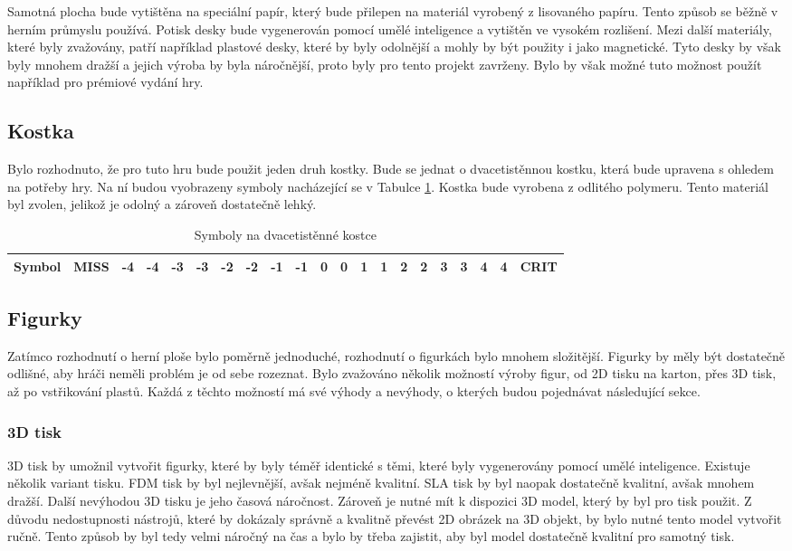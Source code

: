 Samotná plocha bude vytištěna na speciální papír, který bude přilepen na materiál vyrobený z lisovaného papíru. Tento způsob se běžně v herním průmyslu používá. Potisk desky bude vygenerován pomocí umělé inteligence a vytištěn ve vysokém rozlišení. Mezi další materiály, které byly zvažovány, patří například plastové desky, které by byly odolnější a mohly by být použity i jako magnetické. Tyto desky by však byly mnohem dražší a jejich výroba by byla náročnější, proto byly pro tento projekt zavrženy. Bylo by však možné tuto možnost použít například pro prémiové vydání hry.

\subsection{Kostka}
Bylo rozhodnuto, že pro tuto hru bude použit jeden druh kostky. Bude se jednat o dvacetistěnnou kostku, která bude upravena s ohledem na potřeby hry. Na ní budou vyobrazeny symboly nacházející se v Tabulce \ref{tab:dice_symbols}. Kostka bude vyrobena z odlitého polymeru. Tento materiál byl zvolen, jelikož je odolný a zároveň dostatečně lehký.

\begin{table}[H]
    \centering
    \begin{tabular}{*{21}{c}}
        \toprule
        \multicolumn{1}{c|}{\textbf{Symbol}} & MISS & -4 & -4 & -3 & -3 & -2 & -2 & -1 & -1 & 0 & 0 & 1 & 1 & 2 & 2 & 3 & 3 & 4 & 4 & CRIT \\
        \bottomrule
    \end{tabular}
    \caption{Symboly na dvacetistěnné kostce}
    \label{tab:dice_symbols}
\end{table}

\subsection{Figurky}
Zatímco rozhodnutí o herní ploše bylo poměrně jednoduché, rozhodnutí o figurkách bylo mnohem složitější. Figurky by měly být dostatečně odlišné, aby hráči neměli problém je od sebe rozeznat. Bylo zvažováno několik možností výroby figur, od 2D tisku na karton, přes 3D tisk, až po vstřikování plastů. Každá z těchto možností má své výhody a nevýhody, o kterých budou pojednávat následující sekce.

\subsubsection*{3D tisk}
3D tisk by umožnil vytvořit figurky, které by byly téměř identické s těmi, které byly vygenerovány pomocí umělé inteligence. Existuje několik variant tisku. FDM tisk by byl nejlevnější, avšak nejméně kvalitní. SLA tisk by byl naopak dostatečně kvalitní, avšak mnohem dražší. Další nevýhodou 3D tisku je jeho časová náročnost. Zároveň je nutné mít k dispozici 3D model, který by byl pro tisk použit. Z důvodu nedostupnosti nástrojů, které by dokázaly správně a kvalitně převést 2D obrázek na 3D objekt, by bylo nutné tento model vytvořit ručně. Tento způsob by byl tedy velmi náročný na čas a bylo by třeba zajistit, aby byl model dostatečně kvalitní pro samotný tisk.

